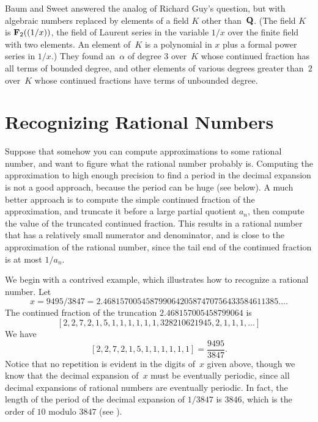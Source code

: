 Baum and Sweet \cite{baum_sweet} answered the analog of Richard
Guy's question, but with algebraic numbers replaced by elements of a
field $K$ other than~$\mathbf{Q}$.  (The field $K$ is $\mathbf{F}_2((1/x))$, the field
of Laurent series in the variable $1/x$ over the finite field with two
elements.  An element of~$K$ is a polynomial in $x$ plus a formal
power series in $1/x$.)  They found an~$\alpha$ of degree 3 over~$K$
whose continued fraction has all terms of bounded degree, and other
elements of various degrees greater than~$2$ over~$K$ whose continued
fractions have terms of unbounded degree.


\section{Recognizing Rational Numbers}
\label{sec:cf_rat}

Suppose that somehow you can compute approximations to some rational
number, and want to figure what the rational number probably is.
Computing the approximation to high enough precision to find a period
in the decimal expansion is not a good approach, because the period
can be huge (see below).  A much better approach is to compute the
simple continued fraction of the approximation, and truncate it before
a large partial quotient $a_n$, then compute the value of the
truncated continued fraction.  This results in a rational number that
has a relatively small numerator and denominator, and is close to the
approximation of the rational number, since the tail end of the
continued fraction is at most $1/a_n$.

We begin with a contrived example, which illustrates how to recognize
a rational number.  Let
$$
  x=9495/3847 = 2.46815700545879906420587470756433584611385\ldots.
$$
The continued fraction of the truncation
$2.468157005458799064$ is
$$
  [2, 2, 7, 2, 1, 5, 1, 1, 1, 1, 1, 1, 328210621945, 2, 1, 1, 1, \ldots ]
$$
We have
$$
[2, 2, 7, 2, 1, 5, 1, 1, 1, 1, 1, 1] = \frac{9495}{3847}.
$$
Notice that no repetition is evident in the digits of~$x$ given
above, though we know that the decimal expansion of~$x$ must be
eventually periodic, since all decimal expansions of rational numbers are
eventually periodic.  In fact, the length of the period of the decimal
expansion of $1/3847$ is $3846$, which is the order of $10$ modulo $3847$
(see ).

